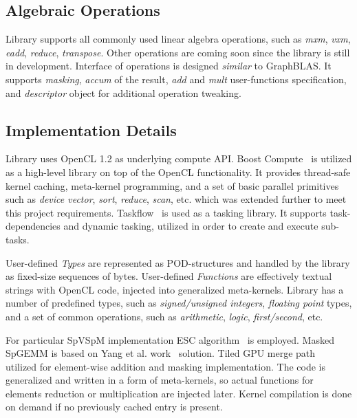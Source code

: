 \subsection{Algebraic Operations}

Library supports all commonly used linear algebra operations, such as \textit{mxm}, \textit{vxm}, \textit{eadd}, \textit{reduce}, \textit{transpose}. 
Other operations are coming soon since the library is still in development.
Interface of operations is designed \textit{similar} to GraphBLAS. 
It supports \textit{masking}, \textit{accum} of the result, \textit{add} and \textit{mult} user-functions specification, and \textit{descriptor} object for additional operation tweaking.

\subsection{Implementation Details}

Library uses OpenCL 1.2 as underlying compute API. 
Boost Compute~\cite{10.1145/2909437.2909454:boost:compute} is utilized as a high-level library on top of the OpenCL functionality. 
It provides thread-safe kernel caching, meta-kernel programming, and a set of basic parallel primitives such as \textit{device vector}, \textit{sort}, \textit{reduce}, \textit{scan}, etc. which was extended further to meet this project requirements.
Taskflow~\cite{Huang2022TaskflowAL} is used as a tasking library. It supports task-dependencies and dynamic tasking, utilized in order to create and execute sub-tasks. 

User-defined \textit{Types} are represented as POD-structures and handled by the library as fixed-size sequences of bytes.
User-defined \textit{Functions} are effectively textual strings with OpenCL code, injected into generalized meta-kernels.
Library has a number of predefined types, such as \textit{signed/unsigned integers}, \textit{floating point} types, and a set of common operations, such as \textit{arithmetic}, \textit{logic}, \textit{first/second}, etc.

For particular SpVSpM implementation ESC algorithm~\cite{10.1145/2699470:esc:algo} is employed. 
Masked SpGEMM is based on Yang et al. work~\cite{yang2019graphblast} solution. 
Tiled GPU merge path~\cite{inproceedings:gpu_merge_path} utilized for element-wise addition and masking implementation.
The code is generalized and written in a form of meta-kernels, so actual functions for elements reduction or multiplication are injected later.
Kernel compilation is done on demand if no previously cached entry is present.